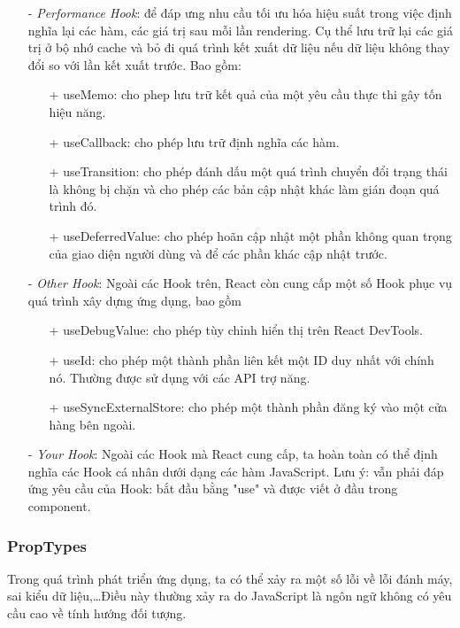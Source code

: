 \begin{enumerate}
\begin{enumerate}
        \end{enumerate}
        \item[-] {\textit{Performance Hook}}: để đáp ưng nhu cầu tối ưu hóa hiệu suất trong việc định nghĩa lại các hàm, các giá trị sau mỗi lần rendering. Cụ thể lưu trữ lại các giá trị ở bộ nhớ cache và bỏ đi quá trình kết xuất dữ liệu nếu dữ liệu không thay đổi so với lần kết xuất trước. Bao gồm:
        \begin{enumerate}
            \item[+] useMemo: cho phep lưu trữ kết quả của một yêu cầu thực thi gây tốn hiệu năng.
            \item[+] useCallback: cho phép lưu trữ định nghĩa các hàm.
            \item[+] useTransition: cho phép đánh dấu một quá trình chuyển đổi trạng thái là không bị chặn và cho phép các bản cập nhật khác làm gián đoạn quá trình đó.
            \item[+] useDeferredValue: cho phép hoãn cập nhật một phần không quan trọng của giao diện người dùng và để các phần khác cập nhật trước.
        \end{enumerate}
        \item[-] {\textit{Other Hook}}: Ngoài các Hook trên, React còn cung cấp một số Hook phục vụ quá trình xây dựng ứng dụng, bao gồm
        \begin{enumerate}
            \item[+] useDebugValue: cho phép tùy chỉnh hiển thị trên React DevTools.
            \item[+] useId: cho phép một thành phần liên kết một ID duy nhất với chính nó. Thường được sử dụng với các API trợ năng. 
            \item[+] useSyncExternalStore: cho phép một thành phần đăng ký vào một cửa hàng bên ngoài.
        \end{enumerate}
        \item[-] {\textit{Your Hook}}: Ngoài các Hook mà React cung cấp, ta hoàn toàn có thể định nghĩa các Hook cá nhân dưới dạng các hàm JavaScript. Lưu ý: vẫn phải đáp ứng yêu cầu của Hook: bắt đầu bằng "use" và được viết ở đầu trong component.
    \end{enumerate}

    \subsubsection{PropTypes}
    Trong quá trình phát triển ứng dụng, ta có thể xảy ra một số lỗi về lỗi đánh máy, sai kiểu dữ liệu,\dots Điều này thường xảy ra do JavaScript là ngôn ngữ không có yêu cầu cao về tính hướng đối tượng.

